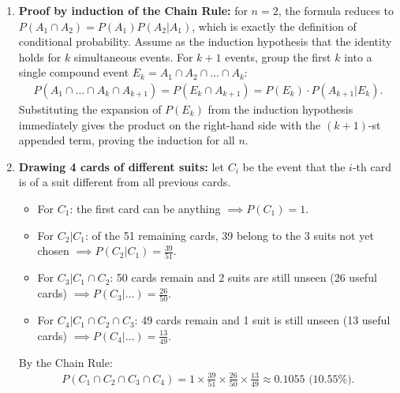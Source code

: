 \begin{solproblema}[prob:8a7282b]
	\begin{enumerate}
		\item \textbf{Proof by induction of the Chain Rule:} for $n=2$, the formula reduces to $P(A_1 \cap A_2) = P(A_1)P(A_2|A_1)$, which is exactly the definition of conditional probability. Assume as the induction hypothesis that the identity holds for $k$ simultaneous events. For $k+1$ events, group the first $k$ into a single compound event $E_k = A_1 \cap A_2 \cap \dots \cap A_k$:
		\begin{align}
			P(A_1 \cap \dots \cap A_k \cap A_{k+1}) = P(E_k \cap A_{k+1}) = P(E_k) \cdot P(A_{k+1}|E_k).
		\end{align}
		Substituting the expansion of $P(E_k)$ from the induction hypothesis immediately gives the product on the right-hand side with the $(k+1)$-st appended term, proving the induction for all $n$.

		\item \textbf{Drawing 4 cards of different suits:} let $C_i$ be the event that the $i$-th card is of a suit different from all previous cards.
		\begin{itemize}
			\item For $C_1$: the first card can be anything $\implies P(C_1) = 1$.
			\item For $C_2|C_1$: of the 51 remaining cards, 39 belong to the 3 suits not yet chosen $\implies P(C_2|C_1) = \frac{39}{51}$.
			\item For $C_3|C_1 \cap C_2$: 50 cards remain and 2 suits are still unseen ($26$ useful cards) $\implies P(C_3|\dots) = \frac{26}{50}$.
			\item For $C_4|C_1 \cap C_2 \cap C_3$: 49 cards remain and 1 suit is still unseen (13 useful cards) $\implies P(C_4|\dots) = \frac{13}{49}$.
		\end{itemize}
		By the Chain Rule:
		\begin{align}
			P(C_1 \cap C_2 \cap C_3 \cap C_4) = 1 \times \frac{39}{51} \times \frac{26}{50} \times \frac{13}{49} \approx 0.1055 \text{ (10.55\%).}
		\end{align}
	\end{enumerate}
\end{solproblema}


